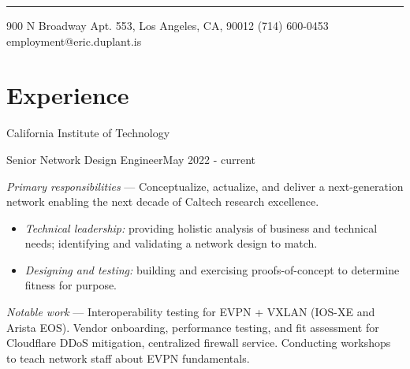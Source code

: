\documentclass[10pt]{article}
\newenvironment{employer_set}[1]{\newcommand{\employer}[0]{{#1}}}{}
\newenvironment{title_itemize}[2]
{
	\noindent{}\textbf{\employer{}}\hfill{}{#2}\\
	\noindent{#1}

	\begin{itemize}[leftmargin=2em, labelindent=\parindent]
}
{
	\end{itemize}
}
\begin{document}
\vspace{1mm}
\hrule
\vspace{1mm}
\noindent{}900 N Broadway Apt. 553, Los Angeles, CA, 90012 \textbar{} (714) 600-0453 \textbar{} employment@eric.duplant.is

\section*{Experience}
\begin{employer_set}{California Institute of Technology}
	\begin{title_itemize}{Senior Network Design Engineer}{May 2022 - current}
		\item{}\emph{Primary responsibilities} --- Conceptualize, actualize, and deliver a next-generation network enabling the next decade of Caltech research excellence.
		\begin{itemize}
			\item{}\emph{Technical leadership:} providing holistic analysis of business and technical needs; identifying and validating a network design to match.
			\item{}\emph{Designing and testing:} building and exercising proofs-of-concept to determine fitness for purpose.
		\end{itemize}
	\item{}\emph{Notable work} --- Interoperability testing for EVPN + VXLAN (IOS-XE and Arista EOS). Vendor onboarding, performance testing, and fit assessment for Cloudflare DDoS mitigation, centralized firewall service. Conducting workshops to teach network staff about EVPN fundamentals.
	\end{title_itemize}
\end{employer_set}
\end{document}
